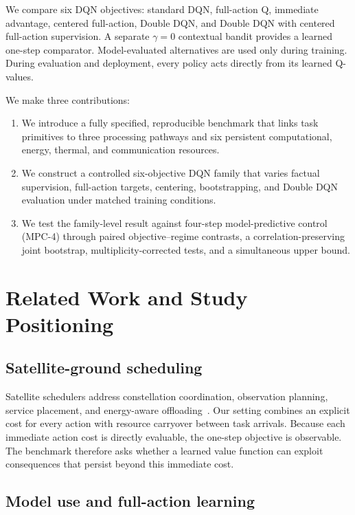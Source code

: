 \documentclass[remotesensing,article,submit,moreauthors]{Definitions/mdpi}
\begin{document}
We compare six DQN objectives: standard DQN, full-action Q, immediate advantage, centered full-action, Double DQN, and Double DQN with centered full-action supervision. A separate $\gamma=0$ contextual bandit provides a learned one-step comparator. Model-evaluated alternatives are used only during training. During evaluation and deployment, every policy acts directly from its learned Q-values.

We make three contributions:

\begin{enumerate}[leftmargin=1.6em]
    \item We introduce a fully specified, reproducible benchmark that links task primitives to three processing pathways and six persistent computational, energy, thermal, and communication resources.
    \item We construct a controlled six-objective DQN family that varies factual supervision, full-action targets, centering, bootstrapping, and Double DQN evaluation under matched training conditions.
    \item We test the family-level result against four-step model-predictive control (MPC-4) through \DQNvsMPCContrastCount{} paired objective--regime contrasts, a correlation-preserving joint bootstrap, multiplicity-corrected tests, and a simultaneous upper bound.
\end{enumerate}

\section{Related Work and Study Positioning}

\subsection{Satellite-ground scheduling}

Satellite schedulers address constellation coordination, observation planning, service placement, and energy-aware offloading~\cite{RN8,RN10,RN20,RN22,RN23,RN27,RN28}. Our setting combines an explicit cost for every action with resource carryover between task arrivals. Because each immediate action cost is directly evaluable, the one-step objective is observable. The benchmark therefore asks whether a learned value function can exploit consequences that persist beyond this immediate cost.

\subsection{Model use and full-action learning}
\end{document}
